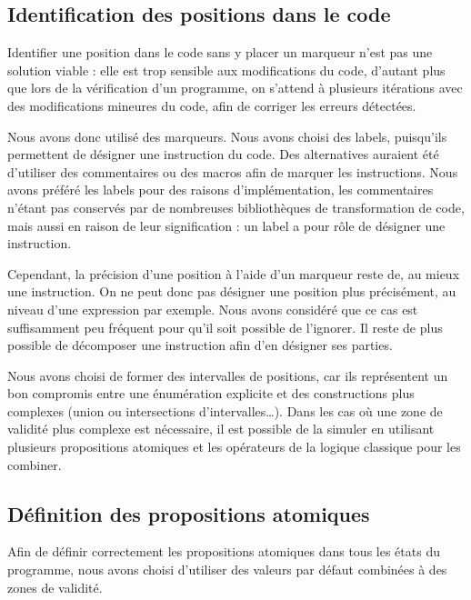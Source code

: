 \subsection{Identification des positions dans le code}

Identifier une position dans le code sans y placer un marqueur n'est pas une
solution viable : elle est trop sensible aux modifications du code, d'autant
plus que lors de la vérification d'un programme, on s'attend à plusieurs
itérations avec des modifications mineures du code, afin de corriger les erreurs
détectées.

Nous avons donc utilisé des marqueurs. Nous avons choisi des labels, puisqu'ils
permettent de désigner une instruction du code. Des alternatives auraient été
d'utiliser des commentaires ou des macros afin de marquer les instructions. Nous
avons préféré les labels pour des raisons d'implémentation, les commentaires
n'étant pas conservés par de nombreuses bibliothèques de transformation de code,
mais aussi en raison de leur signification : un label a pour rôle de désigner
une instruction.

Cependant, la précision d'une position à l'aide d'un marqueur reste de, au
mieux une instruction. On ne peut donc pas désigner une
position plus précisément, au niveau d'une expression par exemple. Nous avons
considéré que ce cas est suffisamment peu fréquent pour qu'il soit possible de
l'ignorer. Il reste de plus possible de décomposer une instruction afin d'en
désigner ses parties.

Nous avons choisi de former des intervalles de positions, car ils représentent un
bon compromis entre une énumération explicite et des constructions plus
complexes (union ou intersections d'intervalles\ldots{}). Dans les cas où une
zone de validité plus complexe est nécessaire, il est possible de la simuler en
utilisant plusieurs propositions atomiques et les opérateurs de la logique
classique pour les combiner.

\subsection{Définition des propositions atomiques}

Afin de définir correctement les propositions atomiques dans tous les
états du programme, nous avons choisi d'utiliser des valeurs par défaut
combinées à des zones de validité.

